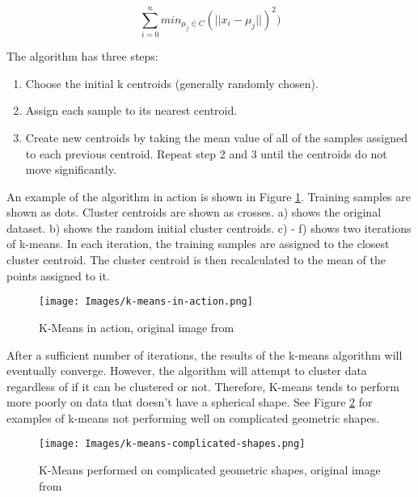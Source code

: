 \documentclass[12pt, a4paper]{article}
\begin{document}
\begin{equation}
    \sum_{i=0}^nmin_{\mu_j\in C}(\vert\vert x_i - \mu_j \vert\vert)^2)
    \label{eq:wcss}
\end{equation}

The algorithm has three steps:

\begin{enumerate}
    \item Choose the initial k centroids (generally randomly chosen).
    \item Assign each sample to its nearest centroid.
    \item Create new centroids by taking the mean value of all of the samples assigned to each previous centroid. Repeat step 2 and 3 until the centroids do not move significantly.
\end{enumerate}

An example of the algorithm in action is shown in Figure \ref{fig:k-means}. Training samples are shown as dots. Cluster centroids are shown as crosses. a) shows the original dataset. b) shows the random initial cluster centroids. c) - f) shows two iterations of k-means. In each iteration, the training samples are assigned to the closest cluster centroid. The cluster centroid is then recalculated to the mean of the points assigned to it.

\begin{figure}[H]
\begin{center}
    \texttt{[image: Images/k-means-in-action.png]}
    \caption{K-Means in action, original image from \cite{k-means-stanford-notes}}
    \label{fig:k-means}
\end{center}
\end{figure}

After a sufficient number of iterations, the results of the k-means algorithm will eventually converge. However, the algorithm will attempt to cluster data regardless of if it can be clustered or not. Therefore, K-means tends to perform more poorly on data that doesn't have a spherical shape. See Figure \ref{fig:k-means-complicated-shapes} for examples of k-means not performing well on complicated geometric shapes. 

\begin{figure}[H]
\begin{center}
    \texttt{[image: Images/k-means-complicated-shapes.png]}
    \caption{K-Means performed on complicated geometric shapes, original image from \cite{k-means-towards-ds}}
    \label{fig:k-means-complicated-shapes}
\end{center}
\end{figure}
\end{document}
